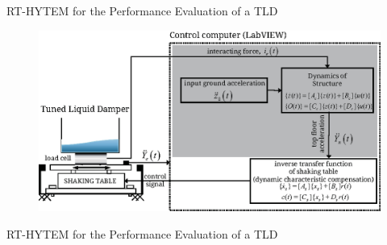 \documentclass[usepdftitle=false]{beamer}
\begin{document}
\begin{frame}{RT-HYTEM for the Performance Evaluation of a TLD}
\begin{figure}[ht]
\centering
\includegraphics[width=1\textwidth] {figure/3-3.eps}
\label{fig:3-3}
\end{figure}
\end{frame}

\begin{frame}{RT-HYTEM for the Performance Evaluation of a TLD}
\begin{figure}[!ht]
\centering
\setcounter{subfigure}{0}
\end{figure}
\end{frame}
\end{document}
